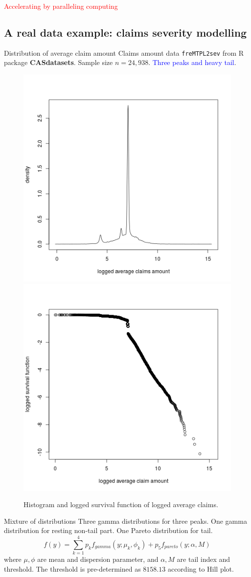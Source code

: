 \documentclass[11pt]{article}
\numberwithin{equation}{section}
\newcommand{\blue}[1]{\textcolor{blue}{#1}}
\newcommand{\red}[1]{\textcolor{red}{#1}}
\begin{document}
\red{Accelerating by paralleling computing}




\subsection{A real data example: claims severity modelling}
		
\begin{frame}{Distribution of average claim amount}
	Claims amount data {\tt freMTPL2sev} from R package {\bf CASdatasets}. Sample size $n=24,938$. \blue{Three peaks and heavy tail}.
	\begin{figure}[h!]
		\centering
		\includegraphics[width=0.35\linewidth]{../plots/sev/hist.png}
		\includegraphics[width=0.35\linewidth]{../plots/sev/log-log.png}
		\caption{Histogram and logged survival function of logged average claims.}\label{tail}
	\end{figure}
\end{frame}

\begin{frame}{Mixture of distributions}
	Three gamma distributions for three peaks. One gamma distribution for resting non-tail part. One Pareto distribution for tail.
	$$f(y)=\sum_{k=1}^4p_kf_{gamma}(y;\mu_k,\phi_k)+p_5f_{pareto}(y;\alpha,M)$$
	where $\mu,\phi$ are mean and dispersion parameter, and $\alpha, M$ are tail index and threshold. The threshold is pre-determined as $8158.13$ according to Hill plot.
\end{frame}
\end{document}
